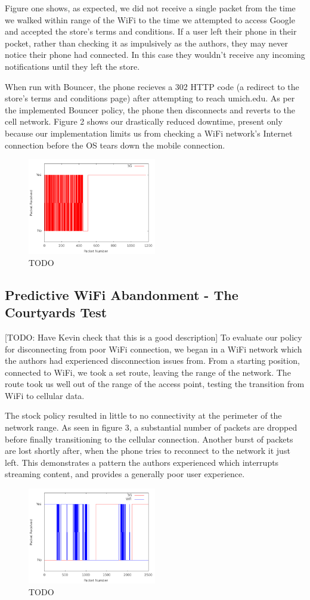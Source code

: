 Figure one shows, as expected, we did not receive a single packet from the time we walked within range of the WiFi to the time we attempted to access Google and accepted the store's terms and conditions. If a user left their phone in their pocket, rather than checking it as impulsively as the authors, they may never notice their phone had connected. In this case they wouldn't receive any incoming notifications until they left the store.

When run with Bouncer, the phone recieves a 302 HTTP code (a redirect to the store's terms and conditions page) after attempting to reach umich.edu. As per the implemented Bouncer policy, the phone then disconnects and reverts to the cell network. Figure 2 shows our drastically reduced downtime, present only because our implementation limits us from checking a WiFi network's Internet connection before the OS tears down the mobile connection.

\begin{figure}
	\includegraphics[width=0.5\textwidth]{paneraWithPolicy}
	\caption{TODO}
\end{figure}

\subsection{Predictive WiFi Abandonment - The Courtyards Test}
[TODO: Have Kevin check that this is a good description]
To evaluate our policy for disconnecting from poor WiFi connection, we began in a WiFi network which the authors had experienced disconnection issues from. From a starting position, connected to WiFi, we took a set route, leaving the range of the network. The route took us well out of the range of the access point, testing the transition from WiFi to cellular data.

The stock policy resulted in little to no connectivity at the perimeter of the network range. As seen in figure 3, a substantial number of packets are dropped before finally transitioning to the cellular connection. Another burst of packets are lost shortly after, when the phone tries to reconnect to the network it just left. This demonstrates a pattern the authors experienced which interrupts streaming content, and provides a generally poor user experience.

\begin{figure}
	\includegraphics[width=0.5\textwidth]{leavingCourtyardsNoPolicy}
	\caption{TODO}
\end{figure}

